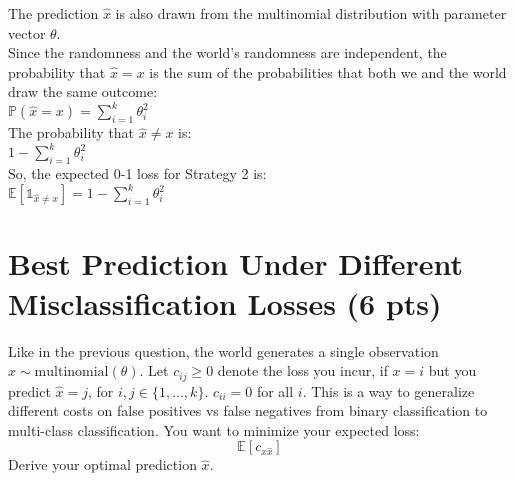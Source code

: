 \documentclass[a4paper]{article}
\theoremstyle{definition}
\def\E{\mathbb E}
\newenvironment{soln}{
    \leavevmode\color{blue}\ignorespaces
}{}
\begin{document}
\begin{soln}
The prediction $\hat{x}$ is also drawn from the multinomial distribution with parameter vector $\theta$.\\

Since the randomness and the world's randomness are independent, the probability that $\hat{x} = x$ is the sum of the probabilities that both we and the world draw the same outcome:\\

$\mathbb{P}(\hat{x} = x) = \sum_{i=1}^{k} \theta_i^2$\\

The probability that $\hat{x} \neq x$ is:\\

$1 - \sum_{i=1}^{k} \theta_i^2$\\

So, the expected 0-1 loss for Strategy 2 is:\\

$\mathbb{E}[\mathbb{1}_{\hat x \neq x}] = 1 - \sum_{i=1}^{k} \theta_i^2$\\

\end{soln}

\section{Best Prediction Under Different Misclassification Losses (6 pts)}
Like in the previous question, 
the world generates a single observation $x \sim \mbox{multinomial}(\theta)$.
Let $c_{ij} \ge 0$ denote the loss you incur, if $x=i$ but you predict $\hat x=j$, for $i,j \in \{1, \ldots, k\}$.
$c_{ii}=0$ for all $i$.
This is a way to generalize different costs on false positives vs false negatives from binary classification to multi-class classification.
You want to minimize your expected loss:
$$\E[c_{x \hat x}]$$
Derive your optimal prediction $\hat x$.\\
\end{document}
